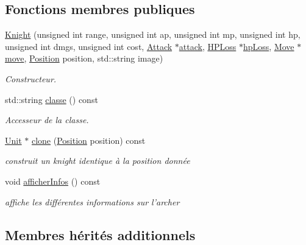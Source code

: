 \subsection*{Fonctions membres publiques}
\begin{DoxyCompactItemize}
\item 
\hypertarget{classKnight_ae965f0055f4e556c17bdd1a48599c11c}{\hyperlink{classKnight_ae965f0055f4e556c17bdd1a48599c11c}{Knight} (unsigned int range, unsigned int ap, unsigned int mp, unsigned int hp, unsigned int dmgs, unsigned int cost, \hyperlink{classAttack}{Attack} $\ast$\hyperlink{classUnit_ac06b8f6e30f851f15a42d8a1d951034a}{attack}, \hyperlink{classHPLoss}{H\+P\+Loss} $\ast$\hyperlink{classUnit_a3090f43e2ee6a08587a160afaa26e7cd}{hp\+Loss}, \hyperlink{classMove}{Move} $\ast$\hyperlink{classUnit_a8c6bfbaf9bf204baec6ba3c11468ec2f}{move}, \hyperlink{classPosition}{Position} position, std\+::string image)}\label{classKnight_ae965f0055f4e556c17bdd1a48599c11c}

\begin{DoxyCompactList}\small\item\em Constructeur. \end{DoxyCompactList}\item 
std\+::string \hyperlink{classKnight_a62f9fd4f850fe38a491cbc31a9768e51}{classe} () const 
\begin{DoxyCompactList}\small\item\em Accesseur de la classe. \end{DoxyCompactList}\item 
\hyperlink{classUnit}{Unit} $\ast$ \hyperlink{classKnight_aff78fcbbd38c405b5c35f348160edce3}{clone} (\hyperlink{classPosition}{Position} position) const 
\begin{DoxyCompactList}\small\item\em construit un knight identique à la position donnée \end{DoxyCompactList}\item 
\hypertarget{classKnight_a3aa88288ca9bc2d319c5ee1b4569fdfc}{void \hyperlink{classKnight_a3aa88288ca9bc2d319c5ee1b4569fdfc}{afficher\+Infos} () const }\label{classKnight_a3aa88288ca9bc2d319c5ee1b4569fdfc}

\begin{DoxyCompactList}\small\item\em affiche les différentes informations sur l'archer \end{DoxyCompactList}\end{DoxyCompactItemize}
\subsection*{Membres hérités additionnels}


